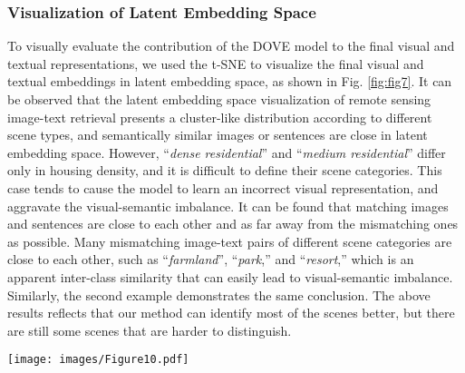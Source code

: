 \documentclass[journal]{IEEEtran}
\begin{document}
\subsubsection{Visualization of Latent Embedding Space}
To visually evaluate the contribution of the DOVE model to the final visual and textual representations, we used the t-SNE \cite{van2008visualizing} to visualize the final visual and textual embeddings in latent embedding space, as shown in Fig. \ref{fig:fig7}. It can be observed that the latent embedding space visualization of remote sensing image-text retrieval presents a cluster-like distribution according to different scene types, and semantically similar images or sentences are close in latent embedding space. However, ``\emph{dense residential}'' and ``\emph{medium residential}'' differ only in housing density, and it is difficult to define their scene categories. This case tends to cause the model to learn an incorrect visual representation, and aggravate the visual-semantic imbalance. It can be found that matching images and sentences are close to each other and as far away from the mismatching ones as possible. Many mismatching image-text pairs of different scene categories are close to each other, such as ``\emph{farmland}'', ``\emph{park},'' and ``\emph{resort},'' which is an apparent inter-class similarity that can easily lead to visual-semantic imbalance. Similarly, the second example demonstrates the same conclusion. The above results reflects that our method can identify most of the scenes better, but there are still some scenes that are harder to distinguish.

\begin{figure*}[ht]
  \centering
  \texttt{[image: images/Figure10.pdf]}
  \caption{Visualization of latent embedding space. Colored numbers represent images or text of different scenes; normal font: final textual embeddings;  bold font: final visual embeddings.}
  \label{fig:fig7}
\end{figure*}
\end{document}
